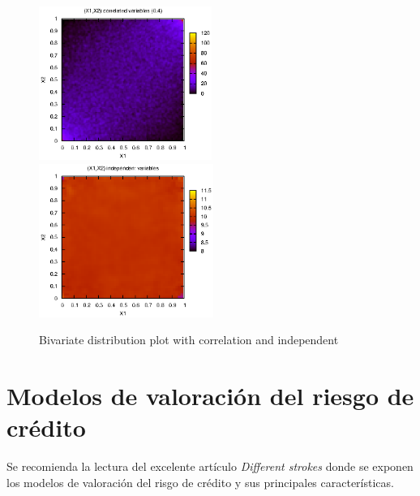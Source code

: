 \begin{figure}[!hb]
\begin{center}
\includegraphics[height=5cm, angle=0]{./images/copula.eps}
\includegraphics[height=5cm, angle=0]{./images/uniform.eps}
\caption{Bivariate distribution plot with correlation and independent}
\label{fig1}
\end{center}
\end{figure}

\section{Modelos de valoraci\'on del riesgo de cr\'edito}

Se recomienda la lectura del excelente art\'iculo \emph{Different strokes}
\cite{Risk:Dif_Str} donde se exponen los modelos de valoraci\'on del 
risgo de cr\'edito y sus principales caracter\'isticas. 


